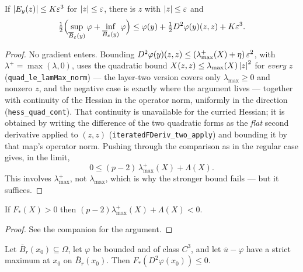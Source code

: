 \begin{theorem}\label{thm:reflect}
\leanok
If $\left\lvert E_y(z)\right\rvert \le K\varepsilon^3$ for $\left\lvert z\right\rvert \le \varepsilon$, there is $z$ with
$\left\lvert z\right\rvert \le \varepsilon$ and
\[
  \tfrac12\Bigl(\sup_{\overline{B}_\varepsilon(y)}\varphi + \inf_{\overline{B}_\varepsilon(y)}\varphi\Bigr)
  \le \varphi(y) + \tfrac12 D^2\varphi(y)(z,z) + K\varepsilon^3 .
\]
\end{theorem}

\begin{proof}
\leanok
{}
No gradient enters. Bounding
$D^2\varphi(y)(z,z) \le (\lambda_{\max}^+(X) + \eta)\,\varepsilon^2$, with
$\lambda^+ = \max(\lambda, 0)$, uses the quadratic bound
$X(z,z) \le \lambda_{\max}(X)\left\lvert z\right\rvert^2$ for \emph{every} $z$
(\texttt{quad\_le\_lamMax\_norm}) --- the layer-two version covers only
$\lambda_{\max} \ge 0$ and nonzero $z$, and the negative case is exactly where
the argument lives --- together with continuity of the Hessian in the operator
norm, uniformly in the direction (\texttt{hess\_quad\_cont}). That continuity
is unavailable for the curried Hessian; it is obtained by writing the
difference of the two quadratic forms as the \emph{flat} second derivative
applied to $(z,z)$ (\texttt{iteratedFDeriv\_two\_apply}) and bounding it by
that map's operator norm. Pushing through the comparison as in the regular case
gives, in the limit,
\[
  0 \le (p-2)\,\lambda_{\max}^+(X) + \Lambda(X).
\]
This involves $\lambda_{\max}^+$, not $\lambda_{\max}$, which is why the
stronger bound fails --- but it suffices.
\end{proof}


\begin{lemma}\label{lem:reflectneg}
\leanok
If $F_*(X) > 0$ then $(p-2)\lambda_{\max}^+(X) + \Lambda(X) < 0$.
\end{lemma}

\begin{proof}
\leanok
{}
See the companion for the argument.
\end{proof}


\begin{theorem}\label{thm:singsub}
\leanok
Let $\overline{B}_r(x_0) \subseteq \Omega$, let $\varphi$ be bounded and of
class $C^3$, and let $\overline{u} - \varphi$ have a strict maximum at $x_0$ on
$\overline{B}_r(x_0)$. Then $F_*(D^2\varphi(x_0)) \le 0$.
\end{theorem}

